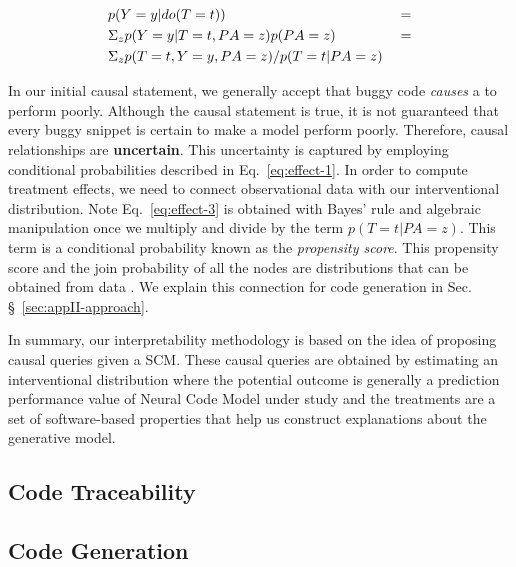 \begin{subequations}
    {%
        \begin{align}
        &p(Y=y|do(T=t)) &&=  \label{eq:effect-1}\\
        &\Sigma_z p(Y=y|T=t,PA=z)p(PA=z)  &&= \label{eq:effect-2}\\
        &\Sigma_z p(T=t,Y=y,PA=z)/p(T=t|PA=z) \label{eq:effect-3}
        \end{align}
    }
\label{eq:effect}
\end{subequations}

In our initial causal statement, we generally accept that buggy code \textit{causes} a \nlm to perform poorly. Although the causal statement is true, it is not guaranteed that every buggy snippet is certain to make a model perform poorly. Therefore, causal relationships are \textbf{uncertain}. This uncertainty is captured by employing conditional probabilities described in Eq.~\ref{eq:effect-1}. In order to compute treatment effects, we need to connect observational data with our interventional distribution. Note Eq.~\ref{eq:effect-3} is obtained with Bayes' rule and algebraic manipulation once we multiply and divide by the term $p(T=t|PA=z)$. This term is a conditional probability known as the \textit{propensity score}. This propensity score and the join probability of all the nodes are distributions that can be obtained from data \citep{Pearl2016Causality}. We explain this connection for code generation in Sec. \S~\ref{sec:appII-approach}. 

In summary, our interpretability methodology \codegen is based on the idea of proposing causal queries given a SCM. These causal queries are obtained by estimating an interventional distribution where the potential outcome is generally a prediction performance value of Neural Code Model under study and the treatments are a set of software-based properties that help us construct explanations about the generative model.

\subsection{Code Traceability}

\subsection{Code Generation}